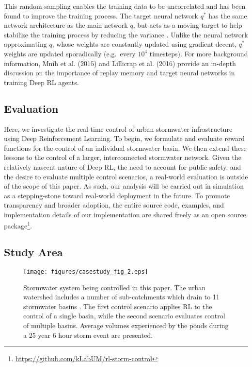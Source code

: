 This random sampling enables the training data to be uncorrelated and has been found to improve the training process.
The target neural network  $q^*$ has the same network architecture as the main network $q$, but acts as a moving target to help stabilize the training process by reducing the variance \cite{Mnih2015}.
Unlike the neural network approximating $q$, whose weights are constantly updated using gradient decent, $q^*$  weights are updated sporadically (e.g.\ every $10^4$ timesteps).
For more background information, Mnih et al. (2015)\cite{Mnih2015} and Lillicrap et al.  (2016)\cite{Lillicrap2015ContinuousLearning} provide an in-depth discussion on the importance of replay memory and target neural networks in training Deep RL agents.



\subsection{\textbf{Evaluation}}
Here, we investigate the real-time control of urban stormwater infrastructure using Deep Reinforcement Learning.
To begin, we formulate and evaluate reward functions for the control of an individual stormwater basin.
We then extend these lessons to the control of a larger, interconnected stormwater network.
Given the relatively nascent nature of Deep RL, the need to account for public safety, and the desire to evaluate multiple control scenarios, a real-world evaluation is outside of the scope of this paper.
As such, our analysis will be carried out in simulation as a stepping-stone toward real-world deployment in the future.
To promote transparency and broader adoption, the entire source code, examples, and implementation details of our implementation are shared freely as an open source package\footnote{\href{https://github.com/kLabUM/rl-storm-control}{https://github.com/kLabUM/rl-storm-control}}.


\subsection{\textbf{Study Area}}
\begin{figure}[H]
    \centering
    \texttt{[image: figures/casestudy\_fig\_2.eps]}
    \caption{Stormwater system being controlled in this paper. The urban watershed includes a number of sub-catchments which drain to 11 stormwater basins . The first control scenario applies RL to the control of a single basin, while the second scenario evaluates control of multiple basins.  Average volumes experienced by the ponds during a 25 year 6 hour storm event are presented.}
    \label{fig:2}
\end{figure}


